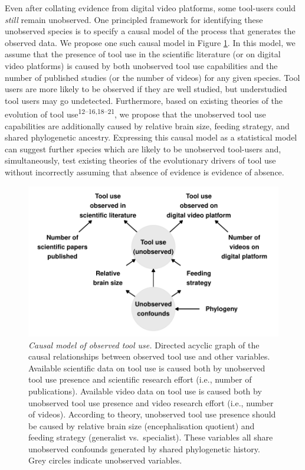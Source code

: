 \documentclass[
  man, donotrepeattitle,floatsintext]{apa6}
\begin{document}
Even after collating evidence from digital video platforms, some tool-users
could \emph{still} remain unobserved. One principled framework for identifying these
unobserved species is to specify a causal model of the process that generates
the observed data. We propose one such causal model in Figure
\ref{fig:plotDAG}. In this model, we assume that the presence of tool use in
the scientific literature (or on digital video platforms) is caused by both
unobserved tool use capabilities and the number of published studies (or the
number of videos) for any given species. Tool users are more likely to be
observed if they are well studied, but understudied tool users may go
undetected. Furthermore, based on existing theories of the evolution of tool use\textsuperscript{12--16,18--21}, we propose
that the unobserved tool use capabilities are additionally caused by relative
brain size, feeding strategy, and shared phylogenetic ancestry. Expressing this
causal model as a statistical model can suggest further species which are likely
to be unobserved tool-users and, simultaneously, test existing theories of the
evolutionary drivers of tool use without incorrectly assuming that absence of
evidence is evidence of absence.












\begin{figure}
\centering
\includegraphics{manuscript_files/figure-latex/plotDAG-1.pdf}
\caption{\label{fig:plotDAG}\emph{Causal model of observed tool use.} Directed acyclic graph
of the causal relationships between observed tool use and other variables.
Available scientific data on tool use is caused both by unobserved tool use
presence and scientific research effort (i.e., number of publications).
Available video data on tool use is caused both by unobserved tool use
presence and video research effort (i.e., number of videos). According to
theory, unobserved tool use presence should be caused by relative brain size
(encephalisation quotient) and feeding strategy (generalist vs.~specialist).
These variables all share unobserved confounds generated by shared phylogenetic
history. Grey circles indicate unobserved variables.}
\end{figure}
\end{document}
